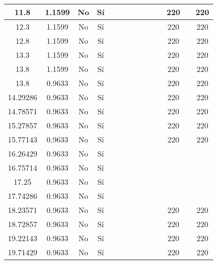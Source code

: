 \begin{table}[H]
{\begin{tabular}{|c|c|c|c|c|c|c|c|c|c|c|c|c|c|}
\hline
11.8 & 1.1599 & No  & Sí  &     &     &     &     &     &     &     & 220 &     & 220 \bigstrut\\
\hline
12.3 & 1.1599 & No  & Sí  &     &     &     &     &     &     &     & 220 &     & 220 \bigstrut\\
\hline
12.8 & 1.1599 & No  & Sí  &     &     &     &     &     &     &     & 220 &     & 220 \bigstrut\\
\hline
13.3 & 1.1599 & No  & Sí  &     &     &     &     &     &     &     & 220 &     & 220 \bigstrut\\
\hline
13.8 & 1.1599 & No  & Sí  &     &     &     &     &     &     &     & 220 &     & 220 \bigstrut\\
\hline
13.8 & 0.9633 & No  & Sí  &     &     &     &     &     &     &     & 220 &     & 220 \bigstrut\\
\hline
14.29286 & 0.9633 & No  & Sí  &     &     &     &     &     &     &     & 220 &     & 220 \bigstrut\\
\hline
14.78571 & 0.9633 & No  & Sí  &     &     &     &     &     &     &     & 220 &     & 220 \bigstrut\\
\hline
15.27857 & 0.9633 & No  & Sí  &     &     &     &     &     &     &     & 220 &     & 220 \bigstrut\\
\hline
15.77143 & 0.9633 & No  & Sí  &     &     &     &     &     &     &     & 220 &     & 220 \bigstrut\\
\hline
16.26429 & 0.9633 & No  & Sí  &     &     &     &     &     &     &     &     &     &  \bigstrut\\
\hline
16.75714 & 0.9633 & No  & Sí  &     &     &     &     &     &     &     &     &     &  \bigstrut\\
\hline
17.25 & 0.9633 & No  & Sí  &     &     &     &     &     &     &     &     &     &  \bigstrut\\
\hline
17.74286 & 0.9633 & No  & Sí  &     &     &     &     &     &     &     &     &     &  \bigstrut\\
\hline
18.23571 & 0.9633 & No  & Sí  &     &     &     &     &     &     &     & 220 &     & 220 \bigstrut\\
\hline
18.72857 & 0.9633 & No  & Sí  &     &     &     &     &     &     &     & 220 &     & 220 \bigstrut\\
\hline
19.22143 & 0.9633 & No  & Sí  &     &     &     &     &     &     &     & 220 &     & 220 \bigstrut\\
\hline
19.71429 & 0.9633 & No  & Sí  &     &     &     &     &     &     &     & 220 &     & 220 \bigstrut\\

\end{tabular}}
\end{table}
